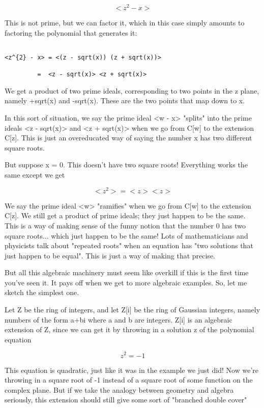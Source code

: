 $$

<z^{2} - x>
$$
    
This is not prime, but we can factor it, which in this case simply 
amounts to factoring the polynomial that generates it:


\begin{verbatim}

<z^{2} - x> = <(z - sqrt(x)) (z + sqrt(x))> 

         =  <z - sqrt(x)> <z + sqrt(x)>
\end{verbatim}
    
We get a product of two prime ideals, corresponding to two points in 
the z plane, namely +sqrt(x) and -sqrt(x).  These are the two points
that map down to x.

In this sort of situation, we say the prime ideal <w - x> 
"splits"
into the prime ideals <z - sqrt(x)> and <z + sqrt(x)> when 
we go from
C[w] to the extension C[z].  This is just an overeducated way of saying
the number x has two different square roots.

But suppose x = 0.  This doesn't have two square roots!  Everything
works the same except we get


$$

<z^{2}> = <z> <z>
$$
    
We say the prime ideal <w> "ramifies" when we go 
from C[w] to the 
extension C[z].  We still get a product of prime ideals; they just happen 
to be the same.  This is a way of making sense of the funny notion that 
the number 0 has two square roots... which just happen to be the same!  
Lots of mathematicians and physicists talk about "repeated roots"
when 
an equation has "two solutions that just happen to be equal".  
This is just a way of making that precise.

But all this algebraic machinery must seem like overkill if this is the 
first time you've seen it.  It pays off when we get to more algebraic 
examples.  So, let me sketch the simplest one.

Let Z be the ring of integers, and let Z[i] be the ring of Gaussian 
integers, namely numbers of the form a+bi where a and b are integers.  
Z[i] is an algebraic extension of Z, since we can get it by throwing in 
a solution z of the polynomial equation


$$

z^{2} = -1
$$
    

This equation is quadratic, just like it was in the example we just
did!  Now we're throwing in a square root of -1 instead of a square 
root of some function on the complex plane.  But if we take the analogy 
between geometry and algebra seriously, this extension should still give
some sort of "branched double cover"


